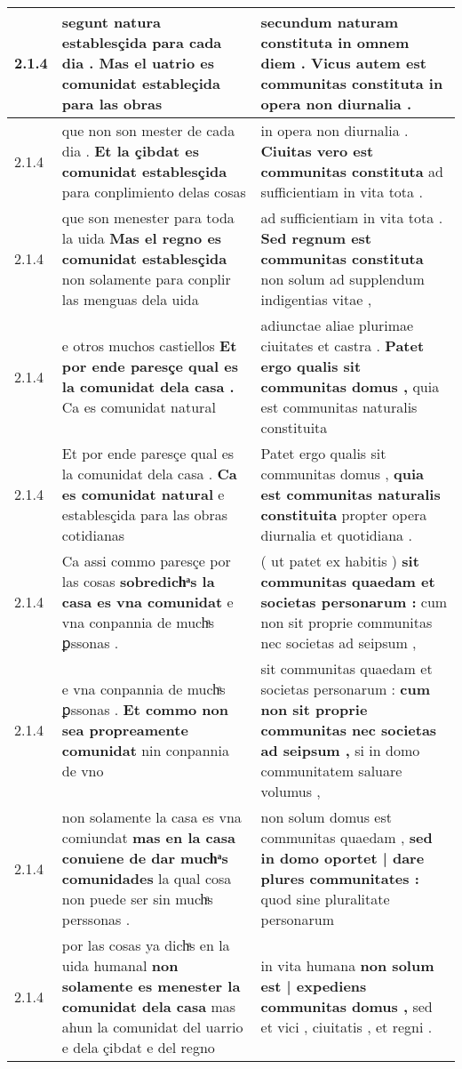 \begin{tabular}{|p{1cm}|p{6.5cm}|p{6.5cm}|}
2.1.4 & segunt natura establesçida para cada dia . \textbf{ Mas el uatrio es comunidat estableçida } para las obras & secundum naturam constituta in omnem diem . \textbf{ Vicus autem est communitas constituta } in opera non diurnalia . \\\hline
2.1.4 & que non son mester de cada dia . \textbf{ Et la çibdat es comunidat establesçida } para conplimiento delas cosas & in opera non diurnalia . \textbf{ Ciuitas vero est communitas constituta } ad sufficientiam in vita tota . \\\hline
2.1.4 & que son menester para toda la uida \textbf{ Mas el regno es comunidat establesçida } non solamente para conplir las menguas dela uida & ad sufficientiam in vita tota . \textbf{ Sed regnum est communitas constituta } non solum ad supplendum indigentias vitae , \\\hline
2.1.4 & e otros muchos castiellos \textbf{ Et por ende paresçe qual es la comunidat dela casa . } Ca es comunidat natural & adiunctae aliae plurimae ciuitates et castra . \textbf{ Patet ergo qualis sit communitas domus , } quia est communitas naturalis constituita \\\hline
2.1.4 & Et por ende paresçe qual es la comunidat dela casa . \textbf{ Ca es comunidat natural } e establesçida para las obras cotidianas & Patet ergo qualis sit communitas domus , \textbf{ quia est communitas naturalis constituita } propter opera diurnalia et quotidiana . \\\hline
2.1.4 & Ca assi commo paresçe por las cosas \textbf{ sobredichͣs la casa es vna comunidat } e vna conpannia de muchͣs ꝑssonas . & ( ut patet ex habitis ) \textbf{ sit communitas quaedam et societas personarum : } cum non sit proprie communitas nec societas ad seipsum , \\\hline
2.1.4 & e vna conpannia de muchͣs ꝑssonas . \textbf{ Et commo non sea propreamente comunidat } nin conpannia de vno & sit communitas quaedam et societas personarum : \textbf{ cum non sit proprie communitas nec societas ad seipsum , } si in domo communitatem saluare volumus , \\\hline
2.1.4 & non solamente la casa es vna comiundat \textbf{ mas en la casa conuiene de dar muchͣs comunidades } la qual cosa non puede ser sin muchͣs perssonas . & non solum domus est communitas quaedam , \textbf{ sed in domo oportet | dare plures communitates : } quod sine pluralitate personarum \\\hline
2.1.4 & por las cosas ya dichͣs en la uida humanal \textbf{ non solamente es menester la comunidat dela casa } mas ahun la comunidat del uarrio e dela çibdat e del regno & in vita humana \textbf{ non solum est | expediens communitas domus , } sed et vici , ciuitatis , et regni . \\\hline

\end{tabular}
